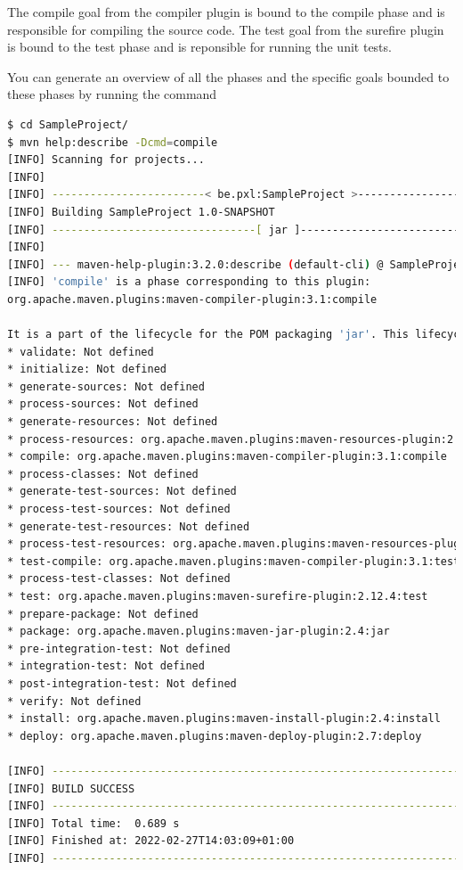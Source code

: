 The compile goal from the compiler plugin is bound to the compile phase and is responsible for compiling the source code. The test goal from the surefire plugin is bound to the test phase and is reponsible for running the unit tests.

You can generate an overview of all the phases and the specific goals bounded to these phases by running the command 

\begin{lstlisting}[language=bash, frame=single]
$ cd SampleProject/
$ mvn help:describe -Dcmd=compile
[INFO] Scanning for projects...
[INFO] 
[INFO] ------------------------< be.pxl:SampleProject >------------------------
[INFO] Building SampleProject 1.0-SNAPSHOT
[INFO] --------------------------------[ jar ]---------------------------------
[INFO] 
[INFO] --- maven-help-plugin:3.2.0:describe (default-cli) @ SampleProject ---
[INFO] 'compile' is a phase corresponding to this plugin:
org.apache.maven.plugins:maven-compiler-plugin:3.1:compile

It is a part of the lifecycle for the POM packaging 'jar'. This lifecycle includes the following phases:
* validate: Not defined
* initialize: Not defined
* generate-sources: Not defined
* process-sources: Not defined
* generate-resources: Not defined
* process-resources: org.apache.maven.plugins:maven-resources-plugin:2.6:resources
* compile: org.apache.maven.plugins:maven-compiler-plugin:3.1:compile
* process-classes: Not defined
* generate-test-sources: Not defined
* process-test-sources: Not defined
* generate-test-resources: Not defined
* process-test-resources: org.apache.maven.plugins:maven-resources-plugin:2.6:testResources
* test-compile: org.apache.maven.plugins:maven-compiler-plugin:3.1:testCompile
* process-test-classes: Not defined
* test: org.apache.maven.plugins:maven-surefire-plugin:2.12.4:test
* prepare-package: Not defined
* package: org.apache.maven.plugins:maven-jar-plugin:2.4:jar
* pre-integration-test: Not defined
* integration-test: Not defined
* post-integration-test: Not defined
* verify: Not defined
* install: org.apache.maven.plugins:maven-install-plugin:2.4:install
* deploy: org.apache.maven.plugins:maven-deploy-plugin:2.7:deploy

[INFO] ------------------------------------------------------------------------
[INFO] BUILD SUCCESS
[INFO] ------------------------------------------------------------------------
[INFO] Total time:  0.689 s
[INFO] Finished at: 2022-02-27T14:03:09+01:00
[INFO] ------------------------------------------------------------------------
\end{lstlisting}


